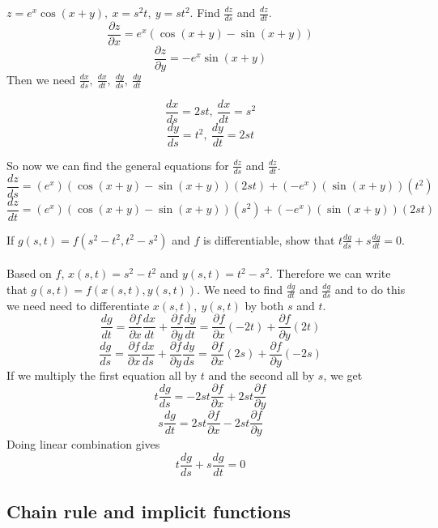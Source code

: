 \documentclass[12 pt]{article}
\begin{document}
        \begin{exmp*}
            $z=e^x\cos(x+y),\ x=s^2t,\ y=st^2$. Find $\frac{dz}{ds}$ and $\frac{dz}{dt}$.
            $$\frac{\partial z}{\partial x}=e^x(\cos(x+y)-\sin(x+y))$$
            $$\frac{\partial z}{\partial y}=-e^x\sin(x+y)$$
            Then we need $\frac{dx}{ds},\ \frac{dx}{dt},\ \frac{dy}{ds},\ \frac{dy}{dt}$
            \begin{center}
                $$\frac{dx}{ds}=2st,\ \frac{dx}{dt}=s^2$$
                $$\frac{dy}{ds}=t^2,\ \frac{dy}{dt}=2st$$
            \end{center}
            So now we can find the general equations for $\frac{dz}{ds}$ and $\frac{dz}{dt}$.
            $$\frac{dz}{ds}=(e^x)(\cos(x+y)-\sin(x+y))(2st)+(-e^x)(\sin(x+y))(t^2)$$
            $$\frac{dz}{dt}=(e^x)(\cos(x+y)-\sin(x+y))(s^2)+(-e^x)(\sin(x+y))(2st)$$
        \end{exmp*}

        \begin{exmp*}
            If $g(s,t)=f(s^2-t^2,t^2-s^2)$ and $f$ is differentiable, show that $t\frac{dg}{ds}+s\frac{dg}{dt}=0$.\\\\
            Based on $f$, $x(s,t)=s^2-t^2$ and $y(s,t)=t^2-s^2$. Therefore we can write that $g(s,t)=f(x(s,t),y(s,t))$. We need to find $\frac{dg}{dt}$ and $\frac{dg}{ds}$ and to do this we need need to differentiate $x(s,t),\ y(s,t)$ by both $s$ and $t$.
            $$\frac{dg}{dt}=\frac{\partial f}{\partial x}\frac{dx}{dt}+\frac{\partial f}{\partial y}\frac{dy}{dt}=\frac{\partial f}{\partial x}(-2t)+\frac{\partial f}{\partial y}(2t)$$
            $$\frac{dg}{ds}=\frac{\partial f}{\partial x}\frac{dx}{ds}+\frac{\partial f}{\partial y}\frac{dy}{ds}=\frac{\partial f}{\partial x}(2s)+\frac{\partial f}{\partial y}(-2s)$$
            If we multiply the first equation all by $t$ and the second all by $s$, we get
            $$t\frac{dg}{ds}=-2st\frac{\partial f}{\partial x}+2st\frac{\partial f}{\partial y}$$
            $$s\frac{dg}{dt}=2st\frac{\partial f}{\partial x}-2st\frac{\partial f}{\partial y}$$
            Doing linear combination gives
            $$t\frac{dg}{ds}+s\frac{dg}{dt}=0$$
        \end{exmp*}

        \subsection{Chain rule and implicit functions}
\end{document}
